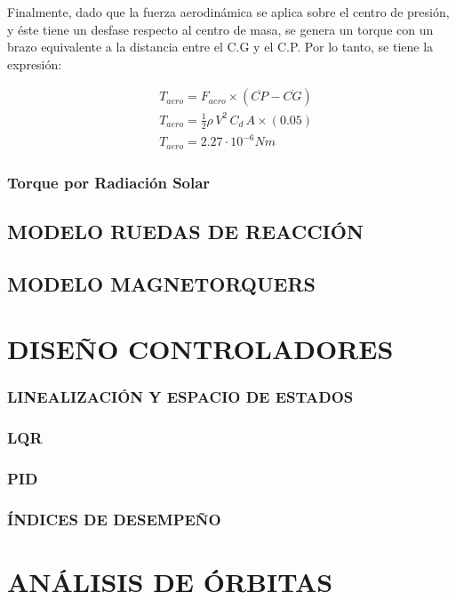 Finalmente, dado que la fuerza aerodinámica se aplica sobre el centro de presión, y éste tiene un desfase respecto al centro de masa, se genera un torque con un brazo equivalente a la distancia entre el C.G y el C.P. Por lo tanto, se tiene la expresión:

$$
\begin{aligned}
		& T_{aero} = F_{aero}\times\left(\overline{CP} - \overline{CG}\right)\\
		& T_{aero} = \frac{1}{2}\rho\,V^2\,C_{d}\,A\times\left(0.05\right) \\
		& T_{aero} =2.27\cdot10^{-6} Nm
\end{aligned}
$$		

 
\subsubsection{Torque por Radiación Solar}

\subsection{MODELO RUEDAS DE REACCIÓN}


\subsection{MODELO MAGNETORQUERS}


\section{DISEÑO CONTROLADORES}
\subsubsection{LINEALIZACIÓN Y ESPACIO DE ESTADOS}
\subsubsection{LQR}
\subsubsection{PID}
\subsubsection{ÍNDICES DE DESEMPEÑO}
\section{ANÁLISIS DE ÓRBITAS}

